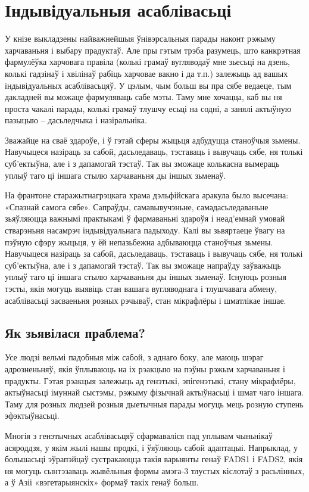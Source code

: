 \chapter{Індывідуальныя асаблівасьці}

У кнізе выкладзены найважнейшыя ўнівэрсальныя парады наконт рэжыму харчаваньня і выбару прадуктаў. Але пры гэтым трэба разумець, што канкрэтная фармулёўка харчовага правіла (колькі грамаў вугляводаў мне зьесьці на дзень, колькі гадзінаў і хвілінаў рабіць харчовае вакно і да т.п.) залежыць ад вашых індывідуальных асаблівасьцяў. У цэлым, чым больш вы пра сябе ведаеце, тым дакладней вы можаце фармуляваць сабе мэты. Таму мне хочацца, каб вы ня проста чакалі парады, колькі грамаў тлушчу есьці на содні, а занялі актыўную пазыцыю – дасьледчыка і назіральніка.

Зважайце на сваё здароўе, і ў гэтай сферы жыцьця адбудуцца станоўчыя зьмены. Навучыцеся назіраць за сабой, дасьледаваць, тэставаць і вывучаць сябе, ня толькі суб'ектыўна, але і з дапамогай тэстаў. Так вы зможаце колькасна вымераць уплыў таго ці іншага стылю харчаваньня ды іншых зьменаў.

На франтоне старажытнагрэцкага храма дэльфійскага аракула было высечана: «Спазнай самога сябе». Сапраўды, самавывучэньне, самадасьледаваньне зьяўляюцца важнымі практыкамі ў фармаваньні здароўя і неад'емнай умовай стварэньня насамрэч індывідуальнага падыходу. Калі вы зьвяртаеце ўвагу на пэўную сфэру жыцьця, у ёй непазьбежна адбываюцца станоўчыя зьмены. Навучыцеся назіраць за сабой, дасьледаваць, тэставаць і вывучаць сябе, ня толькі суб'ектыўна, але і з дапамогай тэстаў. Так вы зможаце напраўду заўважыць уплыў таго ці іншага стылю харчаваньня ды іншых зьменаў. Існуюць розныя тэсты, якія могуць выявіць стан вашага вугляводнага і тлушчавага абмену, асаблівасьці засваеньня розных рэчываў, стан мікрафлёры і шматлікае іншае.

\section{Як зьявілася праблема?}

Усе людзі вельмі падобныя між сабой, з аднаго боку, але маюць шэраг адрозненьняў, якія ўплываюць на іх рэакцыю на пэўны рэжым харчаваньня і прадукты. Гэтая рэакцыя залежыць ад генэтыкі, эпігенэтыкі, стану мікрафлёры, актыўнасьці імуннай сыстэмы, рэжыму фізычнай актыўнасьці і шмат чаго іншага. Таму для розных людзей розныя дыетычныя парады могуць мець розную ступень эфэктыўнасьці.

Многія з генэтычных асаблівасьцяў сфармаваліся пад уплывам чыньнікаў асяроддзя, у якім жылі нашы продкі, і ўяўляюць сабой адаптацыі. Напрыклад, у большасьці эўрапэйцаў сустракаюцца такія варыянты генаў FADS1 і FADS2, якія ня могуць сынтэзаваць жывёльныя формы амэга-3 тлустых кіслотаў з расьлінных, а ў Азіі «вэгетарыянскіх» формаў такіх генаў больш.

